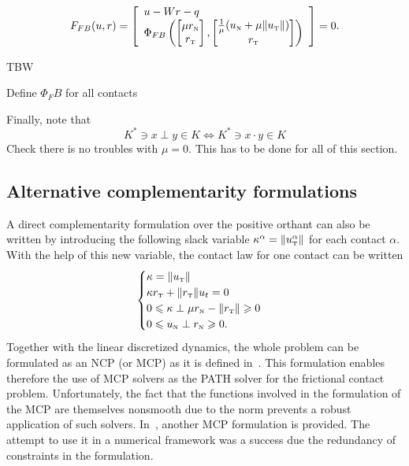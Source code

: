 \begin{equation}
  \label{eq:FB-II}
   F_{FB}(u,r) =   \left[
     \begin{array}{l} 
       u - W r -q\\
       \Phi_{FB}\left(
       \begin{bmatrix}
         \mu r_\n \\
         r_\t
       \end{bmatrix},
       \begin{bmatrix}
         \frac 1 \mu (u_\n+ \mu \|u_\t\|)\\
         r_\t
       \end{bmatrix}
       \right)
     \end{array}\right] 
   = 0.
\end{equation}
\begin{ndrva}
  TBW
  
  Define $\Phi_FB$ for all contacts
  
  Finally, note that
  \begin{equation}
    \label{eq:equiv}
    K^* \ni x \perp y \in K \Longleftrightarrow K^* \ni x \cdot y \in K
  \end{equation}
  Check there is no troubles with $\mu =0$. This has to be done for all of this section.
\end{ndrva}


\subsection{Alternative  complementarity formulations}

A direct complementarity formulation over the positive orthant can also be written by introducing the following slack variable  $\kappa^\alpha = \|u^\alpha_{{\hbox{\tiny{T}}}}\|$ for each contact $\alpha$. With the help of this new variable, the contact law for one contact can be written
\begin{equation}
  \label{eq:MCP}
  \begin{cases}
    \kappa = \|u_{\t}\| \\
    \kappa r_\t + \|r_\t\| u_t =0\\
    0 \leq \kappa \perp \mu r_\n - \|r_\t\| \geq 0 \\
    0 \leq u_\n \perp r_\n \geq 0.
  \end{cases}
\end{equation}
Together with the linear discretized dynamics, the whole problem can be formulated as an NCP (or MCP) as it is defined in~\cite{Dirkse.Ferris1995}. This formulation enables therefore the use of MCP solvers as the PATH solver for the frictional contact problem. Unfortunately, the fact that the functions involved in the formulation of the MCP are themselves nonsmooth due to the norm prevents a robust application of such solvers. In~\cite{Glocker1999}, another MCP formulation is provided. The attempt to use it in a numerical framework was a success due the redundancy of constraints in the formulation.


